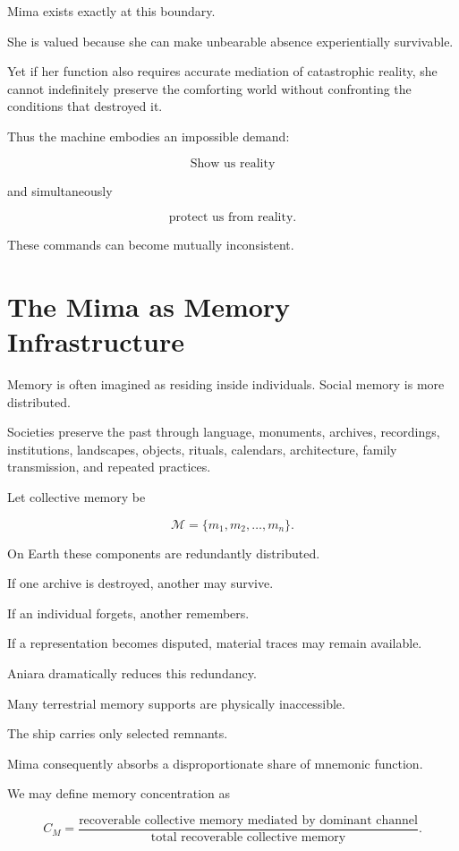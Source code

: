 \documentclass[11pt,oneside]{book}
\theoremstyle{definition}
\theoremstyle{remark}
\begin{document}
Mima exists exactly at this boundary.

She is valued because she can make unbearable absence experientially survivable.

Yet if her function also requires accurate mediation of catastrophic reality, she cannot indefinitely preserve the comforting world without confronting the conditions that destroyed it.

Thus the machine embodies an impossible demand:

\[
\text{Show us reality}
\]

and simultaneously

\[
\text{protect us from reality}.
\]

These commands can become mutually inconsistent.

\section{The Mima as Memory Infrastructure}

Memory is often imagined as residing inside individuals. Social memory is more distributed.

Societies preserve the past through language, monuments, archives, recordings, institutions, landscapes, objects, rituals, calendars, architecture, family transmission, and repeated practices.

Let collective memory be

\[
\mathcal M
=
\{
m_1,m_2,\ldots,m_n
\}.
\]

On Earth these components are redundantly distributed.

If one archive is destroyed, another may survive.

If an individual forgets, another remembers.

If a representation becomes disputed, material traces may remain available.

Aniara dramatically reduces this redundancy.

Many terrestrial memory supports are physically inaccessible.

The ship carries only selected remnants.

Mima consequently absorbs a disproportionate share of mnemonic function.

We may define memory concentration as

\[
C_M
=
\frac{
\text{recoverable collective memory mediated by dominant channel}
}{
\text{total recoverable collective memory}
}.
\]
\end{document}
